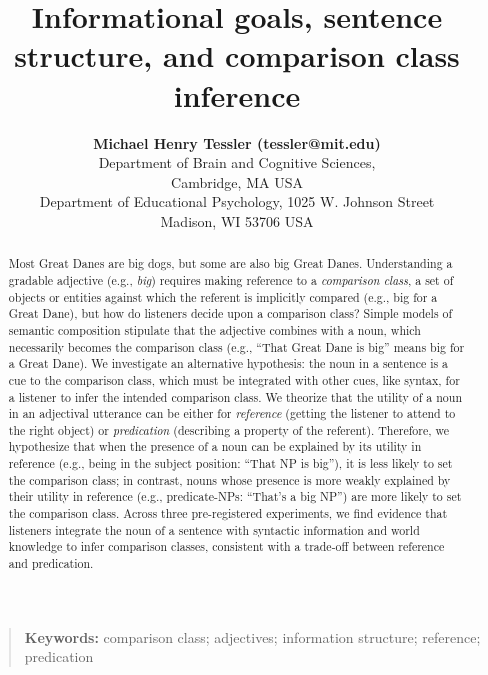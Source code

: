 \documentclass[10pt,letterpaper]{article}
\title{Informational goals, sentence structure, and comparison class inference}
\author{{\large \bf Michael Henry Tessler (tessler@mit.edu)} \\
  Department of Brain and Cognitive Sciences,  \\
  Cambridge, MA  USA
  \AND {\large \bf Sharon J.~Derry (SDJ@Macc.Wisc.Edu)} \\
  Department of Educational Psychology, 1025 W. Johnson Street \\
  Madison, WI 53706 USA}
\begin{document}
\maketitle

\begin{abstract}
   Most Great Danes are big dogs, but some are also big Great Danes. Understanding a gradable adjective (e.g., \emph{big}) requires making reference to a \textit{comparison class}, a set of objects or entities against which the referent is implicitly compared (e.g., big for a Great Dane), but how do listeners decide upon a comparison class? Simple models of semantic composition stipulate that the adjective combines with a noun, which necessarily becomes the comparison class (e.g., ``That Great Dane is big'' means big for a Great Dane). We investigate an alternative hypothesis: the noun in a sentence is a cue to the comparison class, which must be integrated with other cues, like syntax, for a listener to infer the intended comparison class. We theorize that the utility of a noun in an adjectival utterance can be either for \textit{reference} (getting the listener to attend to the right object) or \textit{predication} (describing a property of the referent). Therefore, we hypothesize that when the presence of a noun can be explained by its utility in reference (e.g., being in the subject position: ``That NP is big''), it is less likely to set the comparison class; in contrast, nouns whose presence is more weakly explained by their utility in reference (e.g., predicate-NPs: ``That’s a big NP'') are more likely to set the comparison class. Across three pre-registered experiments, we find evidence that listeners integrate the noun of a sentence with syntactic information and world knowledge to infer comparison classes, consistent with a trade-off between reference and predication.
\end{abstract}

\begin{quote}
\small
\textbf{Keywords:} 
comparison class; adjectives; information structure; reference; predication
\end{quote}


\end{document}

